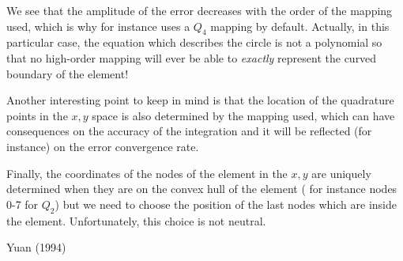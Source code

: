 We see that the amplitude of the error decreases with the order of the mapping used, 
which is why for instance \aspect uses a $Q_4$ mapping by default.
Actually, in this particular case, the equation which describes the circle is not a 
polynomial so that no high-order mapping will ever be able to {\it exactly} 
represent the curved boundary of the element!

Another interesting point to keep in mind is that the location of the quadrature points
in the $x,y$ space is also determined by the mapping used, which can have consequences
on the accuracy of the integration and it will be reflected (for instance) on the 
error convergence rate.

Finally, the coordinates of the nodes of the element in the $x,y$ are 
uniquely determined when they are on the convex hull of the element (
for instance nodes 0-7 for $Q_2$) but we need to choose the position 
of the last nodes which are inside the element. Unfortunately, this choice is 
not neutral. 


\vspace{1cm}

\Literature Yuan \etal (1994) \cite{yuhy94}








 
